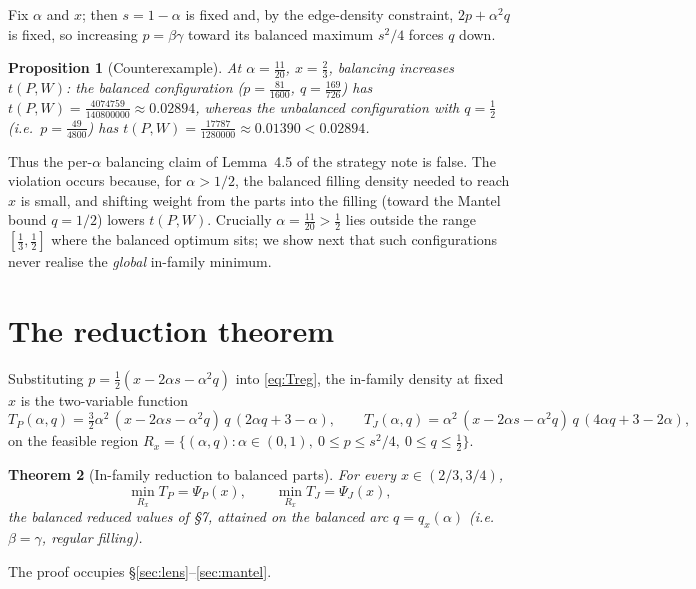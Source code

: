 \documentclass[11pt]{amsart}
\newtheorem{theorem}{Theorem}[section]
\newtheorem{proposition}[theorem]{Proposition}
\theoremstyle{definition}
\begin{document}
Fix $\alpha$ and $x$; then $s=1-\alpha$ is fixed and, by the edge-density
constraint, $2p+\alpha^2 q$ is fixed, so increasing $p=\beta\gamma$ toward its
balanced maximum $s^2/4$ forces $q$ down.

\begin{proposition}[Counterexample]
\label{prop:counter}
At $\alpha=\tfrac{11}{20}$, $x=\tfrac23$, balancing increases $t(P,W)$:
the balanced configuration ($p=\tfrac{81}{1600}$, $q=\tfrac{169}{726}$) has
$t(P,W)=\tfrac{4074759}{140800000}\approx0.02894$, whereas the unbalanced
configuration with $q=\tfrac12$ (i.e.\ $p=\tfrac{49}{4800}$) has
$t(P,W)=\tfrac{17787}{1280000}\approx0.01390<0.02894$.
\end{proposition}

Thus the per-$\alpha$ balancing claim of Lemma~4.5 of the strategy note is
false.  The violation occurs because, for $\alpha>1/2$, the balanced filling
density needed to reach $x$ is small, and shifting weight from the parts into
the filling (toward the Mantel bound $q=1/2$) lowers $t(P,W)$.  Crucially
$\alpha=\tfrac{11}{20}>\tfrac12$ lies outside the range
$[\tfrac13,\tfrac12]$ where the balanced optimum sits; we show next that such
configurations never realise the \emph{global} in-family minimum.

\section{The reduction theorem}
\label{sec:thm}

Substituting $p=\tfrac12(x-2\alpha s-\alpha^2 q)$ into \eqref{eq:Treg}, the
in-family density at fixed $x$ is the two-variable function
\begin{equation}
\label{eq:T2}
   T_P(\alpha,q)=\tfrac32\alpha^2\,(x-2\alpha s-\alpha^2 q)\,q\,(2\alpha q+3-\alpha),
   \qquad
   T_J(\alpha,q)=\alpha^2\,(x-2\alpha s-\alpha^2 q)\,q\,(4\alpha q+3-2\alpha),
\end{equation}
on the feasible region
$R_x=\{(\alpha,q):\alpha\in(0,1),\ 0\le p\le s^2/4,\ 0\le q\le \tfrac12\}$.

\begin{theorem}[In-family reduction to balanced parts]
\label{thm:main}
For every $x\in(2/3,3/4)$,
\[
   \min_{R_x}T_P=\Psi_P(x),\qquad \min_{R_x}T_J=\Psi_J(x),
\]
the balanced reduced values of \S7, attained on the balanced arc
$q=q_x(\alpha)$ (i.e.\ $\beta=\gamma$, regular filling).
\end{theorem}

The proof occupies \S\ref{sec:lens}--\ref{sec:mantel}.
\end{document}
